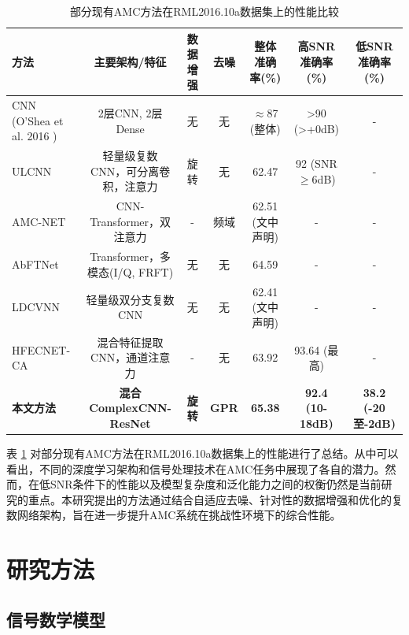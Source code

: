 \documentclass[conference]{IEEEtran}
\begin{document}
\begin{table}[htbp]
\centering
\caption{部分现有AMC方法在RML2016.10a数据集上的性能比较}
\label{tab:sota_comparison_related_work}
\begin{tabular}{@{}lcccccc@{}}
\toprule
方法                          & 主要架构/特征                     & 数据增强 & 去噪 & 整体准确率(\%) & 高SNR准确率(\%) & 低SNR准确率(\%) \\
\midrule
CNN (O'Shea et al. 2016 \cite{oshea2016convolutional}) & 2层CNN, 2层Dense                 & 无       & 无   & $\approx$87 (整体) & >90 (>+0dB) & - \\
ULCNN \cite{b1}               & 轻量级复数CNN，可分离卷积，注意力 & 旋转     & 无   & 62.47 \cite{[23]}\cite{[48]} & 92 (SNR$\ge$6dB) \cite{[48]} & - \\
AMC-NET \cite{b2}             & CNN-Transformer，双注意力         & -        & 频域 & 62.51 (文中声明) & - & - \\
AbFTNet \cite{b3}             & Transformer，多模态(I/Q, FRFT)    & 无       & 无   & 64.59 \cite{[38]}\cite{[41]} & - & - \\
LDCVNN \cite{b4}              & 轻量级双分支复数CNN                & 无       & 无   & 62.41 (文中声明) & - & - \\
HFECNET-CA \cite{b5}          & 混合特征提取CNN，通道注意力         & -        & 无   & 63.92 \cite{[62]} & 93.64 (最高) & - \\
\textbf{本文方法}             & \textbf{混合ComplexCNN-ResNet}    & \textbf{旋转} & \textbf{GPR} & \textbf{65.38} & \textbf{92.4 (10-18dB)} & \textbf{38.2 (-20至-2dB)} \\
\bottomrule
\end{tabular}
\end{table}
表 \ref{tab:sota_comparison_related_work} 对部分现有AMC方法在RML2016.10a数据集上的性能进行了总结。从中可以看出，不同的深度学习架构和信号处理技术在AMC任务中展现了各自的潜力。然而，在低SNR条件下的性能以及模型复杂度和泛化能力之间的权衡仍然是当前研究的重点。本研究提出的方法通过结合自适应去噪、针对性的数据增强和优化的复数网络架构，旨在进一步提升AMC系统在挑战性环境下的综合性能。

\section{研究方法}

\subsection{信号数学模型}
\end{document}
